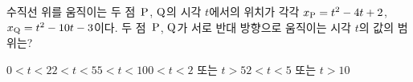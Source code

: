 수직선 위를 움직이는 두 점~$\mathrm{P}$, $\mathrm{Q}$의 시각 $t$에서의 위치가 각각 $x_{\mathrm{P}}=t^2-4t+2$, $x_{\mathrm{Q}}=t^2-10t-3$이다. 두 점~$\mathrm{P}$, $\mathrm{Q}$가 서로 반대 방향으로 움직이는 시각 $t$의 값의 범위는?
\begin{choicesii}{$0<t<2$}{$2<t<5$}{$5<t<10$}{$0<t<2$ 또는 $t>5$}{$2<t<5$ 또는 $t>10$}\end{choicesii}
